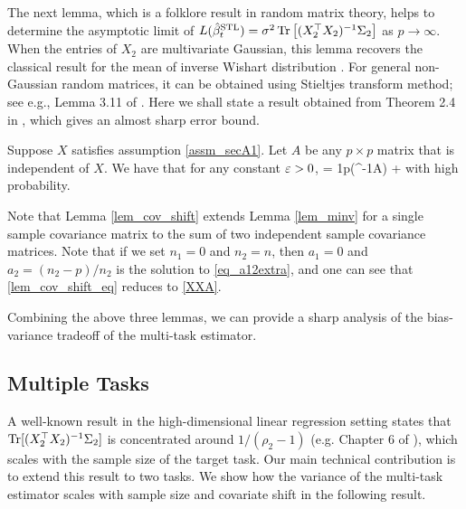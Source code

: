 The next lemma, which is a folklore result in random matrix theory, helps to determine the asymptotic limit of $L(\hat{\beta}_t^{\text{STL}})=\sigma^2   \operatorname{Tr}\left[(X_2^{\top}X_2)^{-1}\Sigma_2\right]$ as $p\to \infty$. When the entries of $X_2$ are multivariate Gaussian, this lemma recovers the classical result for the mean of inverse Wishart distribution \cite{anderson1958introduction}. For general non-Gaussian random matrices, it can be obtained using Stieltjes transform method; see e.g., Lemma 3.11 of \cite{bai2009spectral}. Here we shall state a result obtained from Theorem 2.4 in \cite{isotropic}, which gives an almost sharp error bound.
\begin{lemma}\label{lem_minv}
Suppose $X$ satisfies assumption \ref{assm_secA1}. Let $A$ be any $p\times p$ matrix that is independent of $X$. We have that for any constant ${\varepsilon}>0$,
	\be\label{XXA}   =  \frac1p\tr(\Sigma^{-1}A) + \ee
with high probability.
\end{lemma}
Note that Lemma \ref{lem_cov_shift} extends Lemma \ref{lem_minv} for a single sample covariance matrix to the sum of two independent sample covariance matrices. Note that if we set $n_1=0$ and $n_2=n$, then $a_1 = 0$ and $a_2 = (n_2-p) / n_2$ is the solution to \eqref{eq_a12extra}, and one can see that \eqref{lem_cov_shift_eq} reduces to \eqref{XXA}. 


Combining the above three lemmas, we can provide a sharp analysis of the bias-variance tradeoff of the multi-task estimator.

\subsection{Multiple Tasks}\label{sec_main}

A well-known result in the high-dimensional linear regression setting states that $\operatorname{Tr}[(X_2^{\top}X_2)^{-1}\Sigma_2]$ is concentrated around $1 / (\rho_2 - 1)$ (e.g. Chapter 6 of \cite{S07}), which scales with the sample size of the target task.
Our main technical contribution is to extend this result to two tasks.
We show how the variance of the multi-task estimator scales with sample size and covariate shift in the following result.






